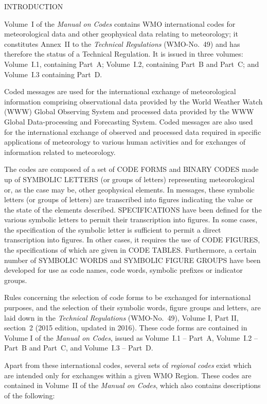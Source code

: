 INTRODUCTION

Volume~I of the \emph{Manual on Codes} contains WMO international codes for meteorological data and other geophysical data relating to meteorology; it constitutes Annex~II to the \emph{Technical Regulations} (WMO-No.~49) and has therefore the status of a Technical Regulation. It is issued in three volumes: Volume~I.1, containing Part~A; Volume~I.2, containing Part~B and Part~C; and Volume~I.3 containing Part~D.

Coded messages are used for the international exchange of meteorological information comprising observational data provided by the World Weather Watch (WWW) Global Observing System and processed data provided by the WWW Global Data-processing and Forecasting System. Coded messages are also used for the international exchange of observed and processed data required in specific applications of meteorology to various human activities and for exchanges of information related to meteorology.

The codes are composed of a set of CODE FORMS and BINARY CODES made up of SYMBOLIC LETTERS (or groups of letters) representing meteorological or, as the case may be, other geophysical elements. In messages, these symbolic letters (or groups of letters) are transcribed into figures indicating the value or the state of the elements described. SPECIFICATIONS have been defined for the various symbolic letters to permit their transcription into figures. In some cases, the specification of the symbolic letter is sufficient to permit a direct transcription into figures. In other cases, it requires the use of CODE FIGURES, the specifications of which are given in CODE TABLES. Furthermore, a certain number of SYMBOLIC WORDS and SYMBOLIC FIGURE GROUPS have been developed for use as code names, code words, symbolic prefixes or indicator groups.

Rules concerning the selection of code forms to be exchanged for international purposes, and the selection of their symbolic words, figure groups and letters, are laid down in the \emph{Technical Regulations} (WMO-No.~49), Volume I, Part II, section~2 (2015 edition, updated in 2016). These code forms are contained in Volume I of the \emph{Manual on Codes}, issued as Volume~I.1 -- Part~A, Volume~I.2 -- Part~B and Part~C, and Volume~I.3 -- Part~D.

Apart from these international codes, several sets of \emph{regional codes} exist which are intended only for exchanges within a given WMO Region. These codes are contained in Volume~II of the \emph{Manual on Codes}, which also contains descriptions of the following:

